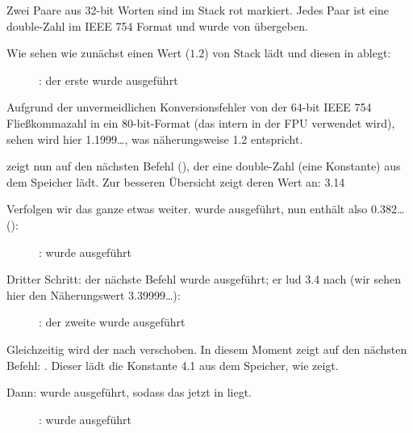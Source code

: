 \clearpage
{}
\myindex{\olly}
Zwei Paare aus 32-bit Worten sind im Stack rot markiert.
Jedes Paar ist eine double-Zahl im IEEE 754 Format und wurde von \main
übergeben.

Wie sehen wie zunächst \FLD einen Wert ($1.2$) von Stack lädt und diesen in
 ablegt:

\begin{figure}[H]
\centering
{}
\caption{\olly: der erste \FLD wurde ausgeführt}
\label{fig:FPU_simple_olly_1}
\end{figure}
Aufgrund der unvermeidlichen Konversionsfehler von der 64-bit IEEE 754
Fließkommazahl in ein 80-bit-Format (das intern in der FPU verwendet wird),
sehen wird hier 1.1999\ldots, was näherungsweise 1.2 entspricht.

\EIP zeigt nun auf den nächsten Befehl (\FDIV), der eine double-Zahl (eine
Konstante) aus dem Speicher lädt. Zur besseren Übersicht zeigt \olly deren Wert
an: 3.14

\clearpage
Verfolgen wir das ganze etwas weiter.
\FDIV wurde ausgeführt, nun enthält  also 0.382\ldots ():

\begin{figure}[H]
\centering
{}
\caption{\olly: \FDIV wurde ausgeführt}
\label{fig:FPU_simple_olly_2}
\end{figure}

\clearpage
Dritter Schritt: der nächste \FLD Befehl wurde ausgeführt; er lud 3.4 nach
 (wir sehen hier den Näherungswert 3.39999\ldots):

\begin{figure}[H]
\centering
{}
\caption{\olly: der zweite \FLD wurde ausgeführt}
\label{fig:FPU_simple_olly_3}
\end{figure}
Gleichzeitig wird der  nach  verschoben.
In diesem Moment zeigt \EIP auf den nächsten Befehl: \FMUL.
Dieser lädt die Konstante 4.1 aus dem Speicher, wie \olly zeigt.

\clearpage
Dann: \FMUL wurde ausgeführt, sodass das  jetzt in  liegt.

\begin{figure}[H]
\centering
{}
\caption{\olly: \FMUL wurde ausgeführt}
\label{fig:FPU_simple_olly_4}
\end{figure}


